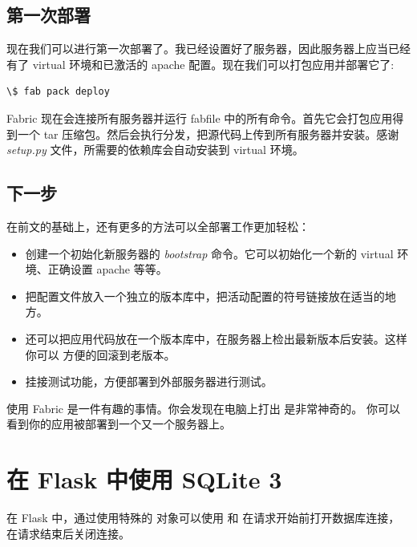 \documentclass[a4paper,12pt]{sphinxmanual}
\begin{document}
\subsection{第一次部署}
\label{patterns/fabric:id3}
现在我们可以进行第一次部署了。我已经设置好了服务器，因此服务器上应当已经有了
virtual 环境和已激活的 apache 配置。现在我们可以打包应用并部署它了:

\begin{Verbatim}[commandchars=\\\{\}]
\$ fab pack deploy
\end{Verbatim}

Fabric 现在会连接所有服务器并运行 fabfile 中的所有命令。首先它会打包应用得到一个
tar 压缩包。然后会执行分发，把源代码上传到所有服务器并安装。感谢 \emph{setup.py}
文件，所需要的依赖库会自动安装到 virtual 环境。


\subsection{下一步}
\label{patterns/fabric:id4}
在前文的基础上，还有更多的方法可以全部署工作更加轻松：
\begin{itemize}
\item {} 
创建一个初始化新服务器的 \emph{bootstrap} 命令。它可以初始化一个新的 virtual
环境、正确设置 apache 等等。

\item {} 
把配置文件放入一个独立的版本库中，把活动配置的符号链接放在适当的地方。

\item {} 
还可以把应用代码放在一个版本库中，在服务器上检出最新版本后安装。这样你可以
方便的回滚到老版本。

\item {} 
挂接测试功能，方便部署到外部服务器进行测试。

\end{itemize}

使用 Fabric 是一件有趣的事情。你会发现在电脑上打出  是非常神奇的。
你可以看到你的应用被部署到一个又一个服务器上。


\section{在 Flask 中使用 SQLite 3}
\label{patterns/sqlite3:sqlite3}\label{patterns/sqlite3:flask-sqlite-3}\label{patterns/sqlite3:id5}\label{patterns/sqlite3::doc}
在 Flask 中，通过使用特殊的 {\hyperref[api:flask.g]{}} 对象可以使用
{\hyperref[api:flask.Flask.before_request]{}} 和 {\hyperref[api:flask.Flask.teardown_request]{}}
在请求开始前打开数据库连接，在请求结束后关闭连接。
\end{document}
